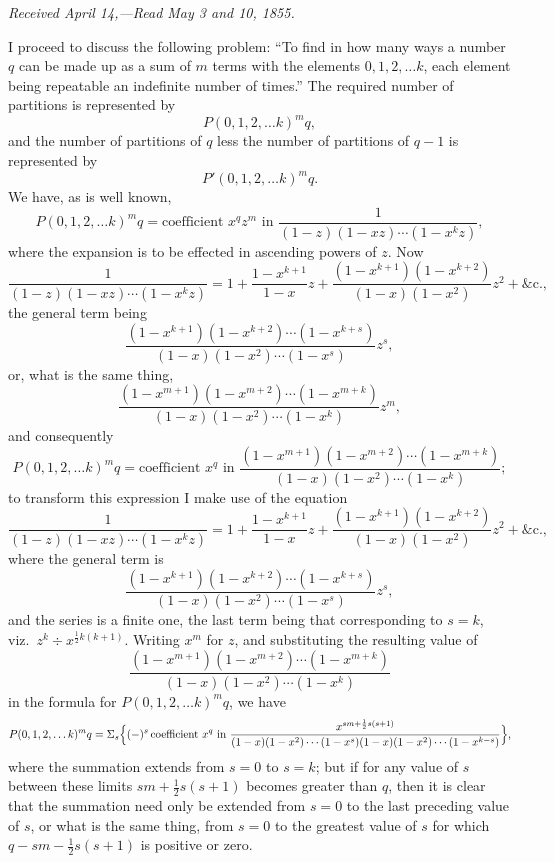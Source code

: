 \documentclass[11pt]{article}
\begin{document}
\bigskip
\noindent\textit{Received April 14,---Read May 3 and 10, 1855.}

\medskip

\noindent I proceed to discuss the following problem: ``To find in how many ways a number $q$ can be made up as a sum of $m$ terms with the elements $0, 1, 2, \ldots k$, each element being repeatable an indefinite number of times.'' The required number of partitions is represented by
\[
P(0, 1, 2, \ldots k)^m q,
\]
and the number of partitions of $q$ less the number of partitions of $q-1$ is represented by
\[
P'(0, 1, 2, \ldots k)^m q.
\]
We have, as is well known,
\[
P(0, 1, 2, \ldots k)^m q = \text{coefficient } x^q z^m \text{ in } \frac{1}{(1-z)(1-xz)\cdots(1-x^k z)},
\]
where the expansion is to be effected in ascending powers of $z$. Now
\[
\frac{1}{(1-z)(1-xz)\cdots(1-x^k z)} = 1 + \frac{1-x^{k+1}}{1-x}z + \frac{(1-x^{k+1})(1-x^{k+2})}{(1-x)(1-x^2)}z^2 + \&\text{c.},
\]
the general term being
\[
\frac{(1-x^{k+1})(1-x^{k+2})\cdots(1-x^{k+s})}{(1-x)(1-x^2)\cdots(1-x^s)}z^s,
\]
or, what is the same thing,
\[
\frac{(1-x^{m+1})(1-x^{m+2})\cdots(1-x^{m+k})}{(1-x)(1-x^2)\cdots(1-x^k)}z^m,
\]
and consequently
\[
P(0, 1, 2, \ldots k)^m q = \text{coefficient } x^q \text{ in } \frac{(1-x^{m+1})(1-x^{m+2})\cdots(1-x^{m+k})}{(1-x)(1-x^2)\cdots(1-x^k)};
\]
to transform this expression I make use of the equation
\[
\frac{1}{(1-z)(1-xz)\cdots(1-x^k z)} = 1 + \frac{1-x^{k+1}}{1-x}z + \frac{(1-x^{k+1})(1-x^{k+2})}{(1-x)(1-x^2)}z^2 + \&\text{c.},
\]
where the general term is
\[
\frac{(1-x^{k+1})(1-x^{k+2})\cdots(1-x^{k+s})}{(1-x)(1-x^2)\cdots(1-x^s)}z^s,
\]
and the series is a finite one, the last term being that corresponding to $s = k$, viz.\ $z^k \div x^{\frac{1}{2}k(k+1)}$. Writing $x^m$ for $z$, and substituting the resulting value of
\[
\frac{(1-x^{m+1})(1-x^{m+2})\cdots(1-x^{m+k})}{(1-x)(1-x^2)\cdots(1-x^k)}
\]
in the formula for $P(0, 1, 2, \ldots k)^m q$, we have
\[
P(0, 1, 2, \ldots k)^m q = \Sigma_s \Bigl\{(-)^s\,\text{coefficient } x^q \text{ in } \frac{x^{sm + \frac{1}{2}s(s+1)}}{(1-x)(1-x^2)\cdots(1-x^s)(1-x)(1-x^2)\cdots(1-x^{k-s})}\Bigr\},
\]
where the summation extends from $s = 0$ to $s = k$; but if for any value of $s$ between these limits $sm + \tfrac{1}{2}s(s+1)$ becomes greater than $q$, then it is clear that the summation need only be extended from $s = 0$ to the last preceding value of $s$, or what is the same thing, from $s = 0$ to the greatest value of $s$ for which $q - sm - \tfrac{1}{2}s(s+1)$ is positive or zero.
\end{document}
